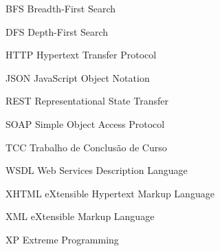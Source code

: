 \begin{siglas}
  \item[BFS] Breadth-First Search
  \item[DFS] Depth-First Search
  \item[HTTP] Hypertext Transfer Protocol
  \item[JSON] JavaScript Object Notation
  \item[REST] Representational State Transfer
  \item[SOAP] Simple Object Access Protocol
  \item[TCC] Trabalho de Conclusão de Curso
  \item[WSDL] Web Services Description Language
  \item[XHTML] eXtensible Hypertext Markup Language
  \item[XML] eXtensible Markup Language
  \item[XP] Extreme Programming
\end{siglas}
